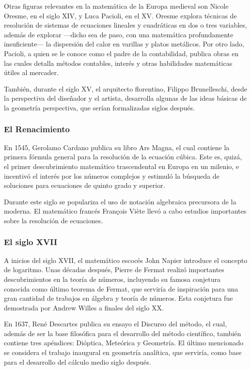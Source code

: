 Otras figuras relevantes en la matemática de la Europa medieval son Nicole Oresme, en el siglo XIV, y Luca Pacioli, en el XV. Oresme explora técnicas de resolución de sistemas de ecuaciones lineales y cuadráticas en dos o tres variables, además de explorar —dicho sea de paso, con una matemática profundamente insuficiente— la dispersión del calor en varillas y platos metálicos. Por otro lado, Pacioli, a quien se le conoce como el padre de la contabilidad, publica obras en las cuales detalla métodos contables, interés y otras habilidades matemáticas útiles al mercader.

También, durante el siglo XV, el arquitecto florentino, Filippo Brunelleschi, desde la perspectiva del diseñador y el artista, desarrolla algunas de las ideas básicas de la geometría perspectiva, que serían formalizadas siglos después. 

\subsubsection*{El Renacimiento}

En 1545, Gerolamo Cardano publica su libro Ars Magna, el cual contiene la primera fórmula general para la resolución de la ecuación cúbica. Este es, quizá, el primer descubrimiento matemático trascendental en Europa en un milenio, e incentivó el interés por los números complejos y estimuló la búsqueda de soluciones para ecuaciones de quinto grado y superior.

Durante este siglo se populariza el uso de notación algebraica precursora de la moderna. El matemático francés François Viète llevó a cabo estudios importantes sobre la resolución de 
ecuaciones.

\subsubsection*{El siglo XVII}
 
A inicios del siglo XVII, el matemático escocés John Napier introduce el concepto de logaritmo. Unas décadas después, Pierre de Fermat realizó importantes descubrimientos en la teoría de números, incluyendo su famosa conjetura conocida como último teorema de Fermat, que serviría de inspiración para una gran cantidad de trabajos en álgebra y teoría de números. Esta conjetura fue demostrada por Andrew Willes a finales del siglo XX.

En 1637, René Descartes publica su ensayo el Discurso del método, el cual, además de ser la base filosófica para el desarrollo del método científico, también contiene tres apéndices: Dióptica, Meteórica y Geometría. El último mencionado se considera el trabajo inaugural en geometría analítica, que serviría, como base para el desarrollo del cálculo medio siglo después.

